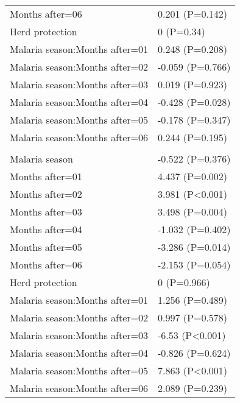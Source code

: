 \documentclass[]{article}
\begin{document}
\begin{longtable}[t]{ll}
\hspace{1em}Months after=06 & 0.201 (P=0.142)\\
\hspace{1em}Herd protection & 0 (P=0.34)\\
\hspace{1em}Malaria season:Months after=01 & 0.248 (P=0.208)\\
\hspace{1em}Malaria season:Months after=02 & -0.059 (P=0.766)\\
\hspace{1em}Malaria season:Months after=03 & 0.019 (P=0.923)\\
\hspace{1em}Malaria season:Months after=04 & -0.428 (P=0.028)\\
\hspace{1em}Malaria season:Months after=05 & -0.178 (P=0.347)\\
\hspace{1em}Malaria season:Months after=06 & 0.244 (P=0.195)\\
\addlinespace[1.5em]
\multicolumn{2}{l}{\textbf{Temporary not field worker}}\\
\hspace{1em}Malaria season & -0.522 (P=0.376)\\
\hspace{1em}Months after=01 & 4.437 (P=0.002)\\
\hspace{1em}Months after=02 & 3.981 (P<0.001)\\
\hspace{1em}Months after=03 & 3.498 (P=0.004)\\
\hspace{1em}Months after=04 & -1.032 (P=0.402)\\
\hspace{1em}Months after=05 & -3.286 (P=0.014)\\
\hspace{1em}Months after=06 & -2.153 (P=0.054)\\
\hspace{1em}Herd protection & 0 (P=0.966)\\
\hspace{1em}Malaria season:Months after=01 & 1.256 (P=0.489)\\
\hspace{1em}Malaria season:Months after=02 & 0.997 (P=0.578)\\
\hspace{1em}Malaria season:Months after=03 & -6.53 (P<0.001)\\
\hspace{1em}Malaria season:Months after=04 & -0.826 (P=0.624)\\
\hspace{1em}Malaria season:Months after=05 & 7.863 (P<0.001)\\
\hspace{1em}Malaria season:Months after=06 & 2.089 (P=0.239)\\*
\end{longtable}
\end{document}
